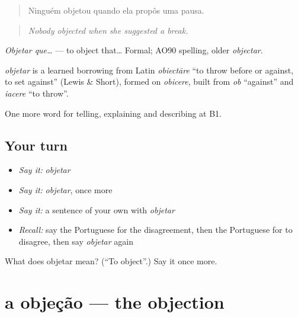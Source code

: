 \begin{quote}
Ninguém objetou quando ela propôs uma pausa.
\end{quote}

\begin{quote}
\emph{Nobody objected when she suggested a break.}
\end{quote}

\emph{Objetar que…} — to object that… Formal; AO90 spelling, older \emph{objectar}.

\begin{cousinweb}
\emph{objetar} is a learned borrowing from Latin \emph{obiectāre} \textquotedblleft{}to throw before or against, to set against\textquotedblright{} (Lewis \& Short), formed on \emph{obicere}, built from \emph{ob} \textquotedblleft{}against\textquotedblright{} and \emph{iacere} \textquotedblleft{}to throw\textquotedblright{}.
\end{cousinweb}

\begin{grammarlens}[title={What you've built}]
One more word for telling, explaining and describing at B1.
\end{grammarlens}

\subsection*{Your turn}
\begin{itemize}
\raggedright
  \item \emph{Say it:} \emph{objetar}
  \item \emph{Say it:} \emph{objetar}, once more
  \item \emph{Say it:} a sentence of your own with \emph{objetar}
  \item \emph{Recall:} say the Portuguese for the disagreement, then the Portuguese for to disagree, then say \emph{objetar} again
\end{itemize}

\begin{tcolorbox}[breakable,colback=teal!4,colframe=teal!35!black,title={Before you move on}]
What does objetar mean? (\textquotedblleft{}To object\textquotedblright{}.) Say it once more.
\end{tcolorbox}
\section[a objeção]{a objeção — the objection}

\label{lesson:PT-C338-objecao}



